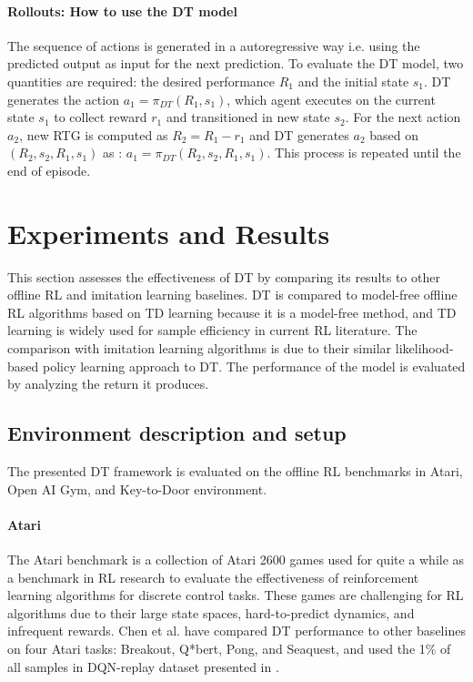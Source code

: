 \documentclass[conference]{IEEEtran}
\begin{document}
\paragraph{\textbf{Rollouts: How to use the DT model}}
The sequence of actions is generated in a autoregressive way i.e. using the predicted output as input for the next prediction. To evaluate the DT model, two quantities are required: the desired performance \(R_1\) and the initial state \(s_1\). DT generates the action \(a_1=\pi_{DT}(R_1,s_1)\), which agent executes on the current state \(s_1\) to collect reward \(r_1\) and transitioned in new state \(s_2\). For the next action \(a_2\), new RTG is computed as \(R_2 = R_1 - r_1\) and DT generates \(a_2\) based on \((R_2,s_2,R_1,s_1)\) as : \(a_1 = \pi_{DT}(R_2,s_2,R_1,s_1)\). This process is repeated until the end of episode.

\section{Experiments and Results}This section assesses the effectiveness of DT by comparing its results to other offline RL and imitation learning baselines. DT is compared to model-free offline RL algorithms based on TD learning because it is a model-free method, and TD learning is widely used for sample efficiency in current RL literature. The comparison with imitation learning algorithms is due to their similar likelihood-based policy learning approach to DT. The performance of the
model is evaluated by analyzing the return it produces.
\subsection{Environment description and setup}
The presented DT framework is evaluated on the offline RL benchmarks in Atari\cite{b13}, Open AI Gym\cite{b14}, and Key-to-Door\cite{b15} environment.
\paragraph{\textbf{Atari}}
The Atari benchmark is a collection of Atari 2600 games used for quite a while as a benchmark in RL research to evaluate the effectiveness of reinforcement learning algorithms for discrete control tasks. These games are challenging for RL algorithms due to their large state spaces, hard-to-predict dynamics, and infrequent rewards. Chen et al.\cite{b1} have compared DT performance to other baselines on four Atari tasks: Breakout, Q*bert, Pong, and Seaquest, and used the 1\% of all samples in DQN-replay dataset presented in \cite{b16}.
\end{document}
